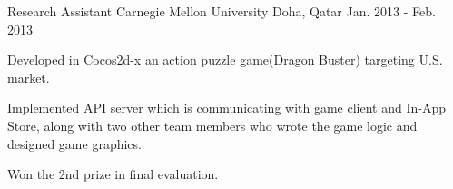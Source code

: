 \begin{cventries}
  \cventry
    {Research Assistant} %
    {Carnegie Mellon University} %
    {Doha, Qatar} %
    {Jan. 2013 - Feb. 2013} %
    {
      \begin{cvitems} %
        \item {Developed in Cocos2d-x an action puzzle game(Dragon Buster) targeting U.S. market.}
        \item {Implemented API server which is communicating with game client and In-App Store, along with two other team members who wrote the game logic and designed game graphics.}
        \item {Won the 2nd prize in final evaluation.}
      \end{cvitems}
    }

\end{cventries}
